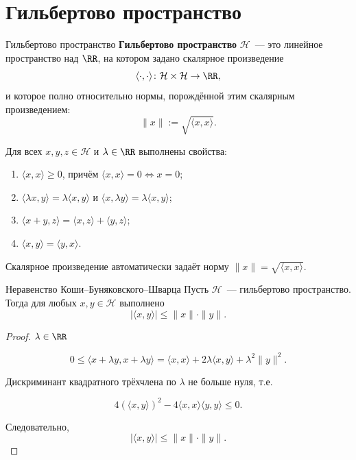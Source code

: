 
\section{Гильбертово пространство}

\begin{Definition}{Гильбертово пространство}{}
	\textbf{Гильбертово пространство} $\mathcal{H}$~--- это линейное пространство над $\RR$, на котором задано скалярное произведение
	\[
	\langle \cdot, \cdot \rangle \colon \mathcal{H} \times \mathcal{H} \to \RR,
	\]
	и которое полно относительно нормы, порождённой этим скалярным произведением:
	\[
	\|x\| := \sqrt{\langle x, x \rangle}.
	\]
	
	Для всех $x,y,z \in \mathcal{H}$ и $\lambda \in \RR$ выполнены свойства:
	\begin{enumerate}
		\item $\langle x, x \rangle \ge 0$, причём $\langle x, x \rangle = 0 \Leftrightarrow x = 0$;
		\item $\langle \lambda x, y \rangle = \lambda \langle x, y \rangle$ и $\langle x, \lambda y \rangle = \lambda \langle x, y \rangle$;
		\item $\langle x + y, z \rangle = \langle x, z \rangle + \langle y, z \rangle$;
		\item $\langle x, y \rangle = \langle y, x \rangle$.
	\end{enumerate}
\end{Definition}

Скалярное произведение автоматически задаёт норму $\|x\| = \sqrt{\langle x, x \rangle}$.

\begin{Proposition}{Неравенство Коши--Буняковского--Шварца}{}
	Пусть $\mathcal{H}$~--- гильбертово пространство. Тогда для любых $x,y \in \mathcal{H}$ выполнено
	\[
	|\langle x, y \rangle| \le \|x\| \cdot \|y\|.
	\]
\end{Proposition}

\begin{proof}
	
	$\lambda \in \RR$
	
	\[
	0 \le \langle x + \lambda y, x + \lambda y \rangle
	= \langle x,x \rangle + 2\lambda \langle x,y \rangle + \lambda^2\|y\|^2.
	\]
	
	Дискриминант квадратного трёхчлена по $\lambda$ не больше нуля, т.е.
	
	\[
	4(\langle x,y \rangle)^2 - 4\langle x,x \rangle\langle y,y \rangle \le 0.
	\]
	
	Следовательно,
	\[
	|\langle x,y \rangle| \le \|x\|\cdot\|y\|.
	\]
\end{proof}

